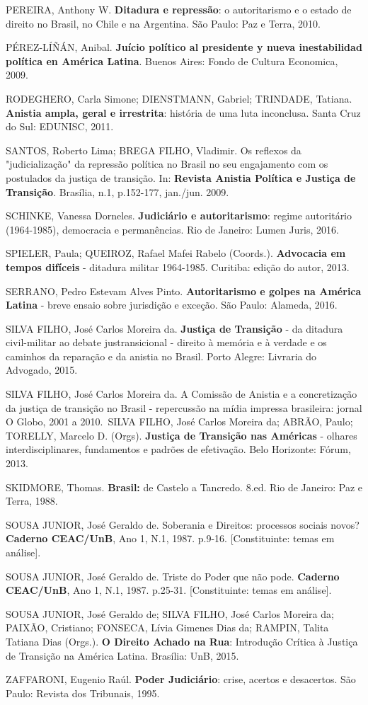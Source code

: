 PEREIRA, Anthony W. \textbf{Ditadura e repressão}: o autoritarismo e o
estado de direito no Brasil, no Chile e na Argentina. São Paulo: Paz e
Terra, 2010.

PÉREZ-LÍÑÁN, Anibal. \textbf{Juício político al presidente y nueva
inestabilidad política en América Latina}. Buenos Aires: Fondo de
Cultura Economica, 2009.

RODEGHERO, Carla Simone; DIENSTMANN, Gabriel; TRINDADE, Tatiana.
\textbf{Anistia ampla, geral e irrestrita}: história de uma luta
inconclusa. Santa Cruz do Sul: EDUNISC, 2011.

SANTOS, Roberto Lima; BREGA FILHO, Vladimir. Os reflexos da
"judicialização" da repressão política no Brasil no seu engajamento com
os postulados da justiça de transição. In: \textbf{Revista Anistia
Política e Justiça de Transição}. Brasília, n.1, p.152-177, jan./jun.
2009.

SCHINKE, Vanessa Dorneles. \textbf{Judiciário e autoritarismo}: regime
autoritário (1964-1985), democracia e permanências. Rio de Janeiro:
Lumen Juris, 2016.

SPIELER, Paula; QUEIROZ, Rafael Mafei Rabelo (Coords.).
\textbf{Advocacia em tempos difíceis} - ditadura militar 1964-1985.
Curitiba: edição do autor, 2013.

SERRANO, Pedro Estevam Alves Pinto. \textbf{Autoritarismo e golpes na
América Latina} - breve ensaio sobre jurisdição e exceção. São Paulo:
Alameda, 2016.

SILVA FILHO, José Carlos Moreira da. \textbf{Justiça de Transição} - da
ditadura civil-militar ao debate justransicional - direito à memória e à
verdade e os caminhos da reparação e da anistia no Brasil. Porto Alegre:
Livraria do Advogado, 2015.

SILVA FILHO, José Carlos Moreira da. A Comissão de Anistia e a
concretização da justiça de transição no Brasil - repercussão na mídia
impressa brasileira: jornal O Globo, 2001 a 2010.~SILVA FILHO, José
Carlos Moreira da; ABRÃO, Paulo; TORELLY, Marcelo D. (Orgs).
\textbf{Justiça de Transição nas Américas} - olhares interdisciplinares,
fundamentos e padrões de efetivação. Belo Horizonte: Fórum, 2013.

SKIDMORE, Thomas. \textbf{Brasil:} de Castelo a Tancredo. 8.ed. Rio de
Janeiro: Paz e Terra, 1988.

SOUSA JUNIOR, José Geraldo de. Soberania e Direitos: processos sociais
novos? \textbf{Caderno CEAC/UnB}, Ano 1, N.1, 1987. p.9-16.
{[}Constituinte: temas em análise{]}.

SOUSA JUNIOR, José Geraldo de. Triste do Poder que não pode.
\textbf{Caderno CEAC/UnB}, Ano 1, N.1, 1987. p.25-31. {[}Constituinte:
temas em análise{]}.

SOUSA JUNIOR, José Geraldo de; SILVA FILHO, José Carlos Moreira da;
PAIXÃO, Cristiano; FONSECA, Lívia Gimenes Dias da; RAMPIN, Talita
Tatiana Dias (Orgs.). \textbf{O Direito Achado na Rua}: Introdução
Crítica à Justiça de Transição na América Latina. Brasília: UnB, 2015.

ZAFFARONI, Eugenio Raúl. \textbf{Poder Judiciário}: crise, acertos e
desacertos. São Paulo: Revista dos Tribunais, 1995.
